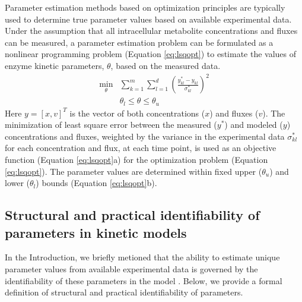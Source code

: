 \documentclass[10pt]{article}
\begin{document}
	Parameter estimation methods based on optimization principles are typically used to determine true parameter values based on available experimental data. Under the assumption that all intracellular metabolite concentrations and fluxes can be measured, a parameter estimation problem can be formulated as a nonlinear programming problem (Equation \ref{eq:lsqopt}) to estimate the values of enzyme kinetic parameters, $\theta$, based on the measured data. 
	\begin{subequations}\label{eq:lsqopt}
		\begin{align}
		\underset{\theta}{\mathrm{min}} &\sum_{k=1}^{m}\sum_{l=1}^{d}\left(\frac{y_{kl}^*-y_{kl}}{\sigma_{kl}^*}\right)^2\\
		&\theta_l \le \theta \le \theta_u
		\end{align}
	\end{subequations}
	Here $y = \left[x, v\right]^T$ is the vector of both concentrations ($x$) and fluxes ($v$). The minimization of least square error between the measured ($y^*$) and modeled ($y$) concentrations and fluxes, weighted by the variance in the experimental data $\sigma_{kl}^*$ for each concentration and flux, at each time point, is used as an objective function (Equation \ref{eq:lsqopt}a) for the optimization problem (Equation \ref{eq:lsqopt}). The parameter values are determined within fixed upper ($\theta_u$) and lower ($\theta_l$) bounds (Equation \ref{eq:lsqopt}b). 
	
	\subsection{Structural and practical identifiability of parameters in kinetic models}	
	In the Introduction, we briefly metioned that the ability to estimate unique parameter values from available experimental data is governed by the identifiability of these parameters in the model \parencite{Ljung1994,Vanlier2012,Berthoumieux2013,Raue2014}. Below, we provide a formal definition of structural and practical identifiability of parameters.
	
\end{document}
